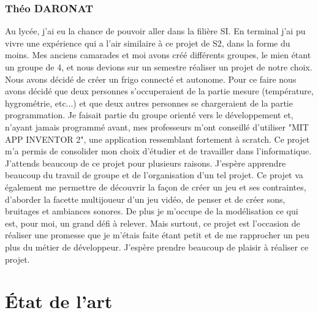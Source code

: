 \documentclass[12pt]{report}
\begin{document}
		\subsection{Théo DARONAT}
			Au lycée, j'ai eu la chance de pouvoir aller dans la filière SI. En terminal j'ai pu vivre une expérience qui a l'air similaire à ce projet de S2, dans la forme du moins. Mes anciens camarades et moi avons créé différents groupes, le mien étant un groupe de 4, et nous devions sur un semestre réaliser un projet de notre choix. Nous avons décidé de créer un frigo connecté et autonome. Pour ce faire nous avons décidé que deux personnes s'occuperaient de la partie mesure (température, hygrométrie, etc...) et que deux autres personnes se chargeraient de la partie programmation. Je faisait partie du groupe orienté vers le développement et, n'ayant jamais programmé avant, mes professeurs m'ont conseillé d'utiliser "MIT APP INVENTOR 2", une application ressemblant fortement à scratch. Ce projet m'a permis de consolider mon choix d'étudier et de travailler dans l'informatique.\\
			
J'attends beaucoup de ce projet pour plusieurs raisons. J'espère apprendre beaucoup du travail de groupe et de l'organisation d'un tel projet. Ce projet va également me permettre de découvrir la façon de créer un jeu et ses contraintes, d'aborder la facette multijoueur d'un jeu vidéo, de penser et de créer sons, bruitages et ambiances sonores. De plus je m'occupe de la modélisation ce qui est, pour moi, un grand défi à relever. Mais surtout, ce projet est l'occasion de réaliser une promesse que je m'étais faite étant petit et de me rapprocher un peu plus du métier de développeur. J'espère prendre beaucoup de plaisir à réaliser ce projet.

\chapter{\'Etat de l'art}
\end{document}
